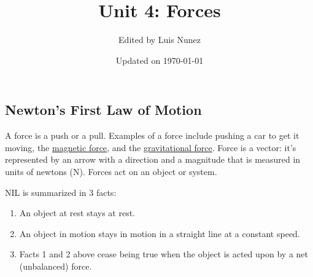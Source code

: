 \documentclass{article}
\title{Unit 4: Forces}
\author{Edited by Luis Nunez}
\date{Updated on \today}
\numberwithin{equation}{section}
\numberwithin{figure}{section}
\begin{document}
\maketitle







\subsection{Newton's First Law of Motion} \label{XeoZti}

A \gls{force} is a push or a pull. Examples of a force include pushing a car to get it moving, the \href{https://youtu.be/gzCXowhks80?t=3}{magnetic force}, and the \href{https://youtu.be/E9oKEJ1pXPw}{gravitational force}. Force is a vector: it's represented by an arrow with a direction and a magnitude that is measured in units of newtons (N). Forces act on an object or system. 

\begin{mdframed}[backgroundcolor=black!10]
\gls{NIL} is summarized in 3 facts:
\vspace{-1ex}

\begin{enumerate}
\setlength\itemsep{0ex}
    \item An object at rest stays at rest.
    \item An object in motion stays in motion in a straight line at a constant speed.
    \item Facts 1 and 2 above cease being true when the object is acted upon by a net (unbalanced) force.
\end{enumerate}
\end{mdframed}
\end{document}
